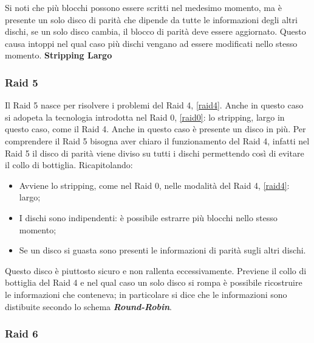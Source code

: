 \documentclass{article}
\begin{document}
Si noti che più blocchi possono essere scritti nel medesimo momento, ma è presente un solo disco di parità che dipende da tutte le informazioni degli altri dischi, se un solo disco cambia, il blocco di parità deve essere aggiornato. Questo causa intoppi nel qual caso più dischi vengano ad essere modificati nello stesso momento. \textbf{Stripping Largo}

\subsubsection{Raid 5}
\label{raid5}
Il Raid 5 nasce per risolvere i problemi del Raid 4, \autoref{raid4}. Anche in questo caso si adopeta la tecnologia introdotta nel Raid 0, \autoref{raid0}: lo stripping, largo in questo caso, come il Raid 4. Anche in questo caso è presente un disco in più. Per comprendere il Raid 5 bisogna aver chiaro il funzionamento del Raid 4, infatti nel Raid 5 il disco di parità viene diviso su tutti i dischi permettendo così di evitare il collo di bottiglia. Ricapitolando:
\begin{itemize}
	\item Avviene lo stripping, come nel Raid 0, nelle modalità del Raid 4, \ref{raid4}: largo;

	\item I dischi sono indipendenti: è possibile estrarre più blocchi nello stesso momento;

	\item Se un disco si guasta sono presenti le informazioni di parità sugli altri dischi.
\end{itemize}

Questo disco è piuttosto sicuro e non rallenta eccessivamente. Previene il collo di bottiglia del Raid 4 e nel qual caso un solo disco si rompa è possibile ricostruire le informazioni che conteneva; in particolare si dice che le informazioni sono distibuite secondo lo schema \textbf{\textit{Round-Robin}}.

\subsubsection{Raid 6}
\label{raid6}
\end{document}
